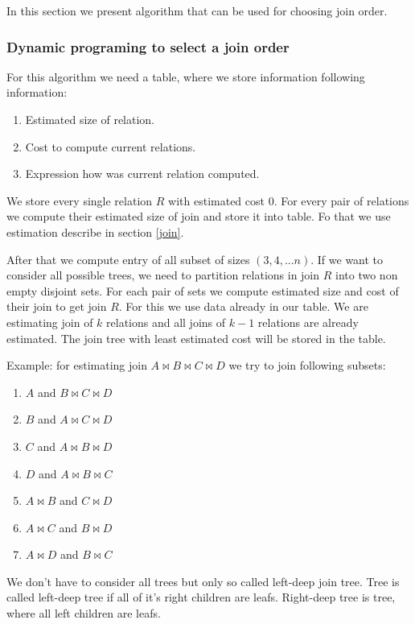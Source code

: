 In this section we present algorithm that can be used for choosing join order.
 
\subsubsection{Dynamic programing to select a join order}
\label{dymanicalgorithm}
For this algorithm we need a table, where we store information following information:
 
\begin{enumerate}
\item Estimated size of relation.
\item Cost to compute current relations.
\item Expression how was current relation computed.
\end{enumerate}

We store every single relation $R$ with estimated cost 0. For every pair of relations we compute their estimated size of join and store it into table. Fo that we use estimation describe in section \ref{join}.  

After that we compute entry of all subset of sizes $(3,4,...n)$.
If we want to consider all possible trees, we need to partition relations in join $R$ into two non empty disjoint sets. For each pair of sets we compute estimated size and cost of their join to get join $R$. For this we use data already in our table. We are estimating join of $k$ relations and all joins of $k-1$ relations are already estimated. The join tree with least estimated cost will be stored in the table.

Example: for estimating join $A\Join B\Join C\Join D$ we try to join following subsets:
\begin{enumerate}
\item $A$ and $B\Join C\Join D$
\item $B$ and $A\Join C\Join D$
\item $C$ and $A\Join B\Join D$
\item $D$ and $A\Join B\Join C$
\item $A\Join B$ and $C\Join D$
\item $A\Join C$ and $B\Join D$
\item $A\Join D$ and $B\Join C$

\end{enumerate}

We don't have to consider all trees but only so called left-deep join tree. Tree is called left-deep tree if all of it's right children are leafs. Right-deep tree is tree, where all left children are leafs.
 
